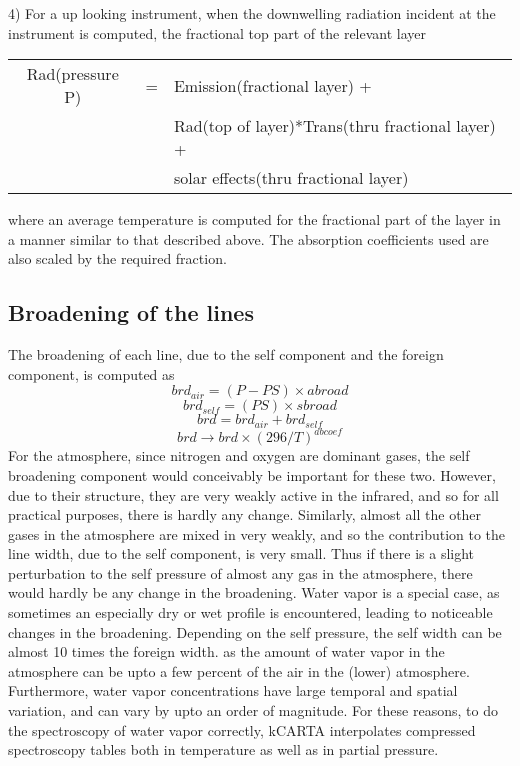 \documentclass[12pt]{article}
\newcommand{\kc}{\textsf{kCARTA}\xspace}
\begin{document}
{{{{4)
For a up looking instrument, when the downwelling radiation incident at 
the instrument is computed, the fractional top part of the relevant layer
\begin{small}
\begin{longtable}{ccl}
Rad(pressure P) & = & Emission(fractional layer) + \\
               & & Rad(top of layer)*Trans(thru fractional layer) +\\
               & & solar effects(thru fractional layer)\\
\end{longtable}
\end{small}
where an average temperature is computed for the fractional part of
the layer in a manner similar to that described above.  The
absorption coefficients used are also scaled by the required
fraction.

\subsection{Broadening of the lines}
The broadening of each line, due to the self component and the foreign  
component, is computed as
\[ 
brd_{air} = (P - PS) \times abroad 
\] 
\[ 
brd_{self} = (PS) \times sbroad 
\] 
\[ 
brd = brd_{air} + brd_{self} 
\] 
\[ 
brd \rightarrow brd \times (296/T)^{abcoef} 
\] 
For the atmosphere, since nitrogen and oxygen are dominant gases, the self 
broadening component would conceivably be important for these two. However, 
due to their structure, they are very weakly active in the infrared, and so 
for all practical purposes, there is hardly any change. Similarly, almost all 
the other gases in the atmosphere  
are mixed in very weakly, and so the contribution to the line width, due  
to the self component, is very small. Thus if there is a slight  
perturbation to the self pressure of almost any gas in the atmosphere,  
there would hardly be any change in the broadening. Water vapor is a  
special case, as sometimes an especially dry or wet profile is  
encountered, leading to noticeable changes in the broadening. Depending on 
the self pressure, the self width can be almost 10 times the foreign width.
as the amount of water vapor in the atmosphere can be upto a few percent of
the air in the (lower) atmosphere. Furthermore, water vapor concentrations 
have large temporal and spatial variation, and can vary by upto an order of 
magnitude. For these reasons, to do the spectroscopy of water vapor correctly,
\kc interpolates compressed spectroscopy tables both in temperature as well
as in partial pressure. 

}}}}
\end{document}
